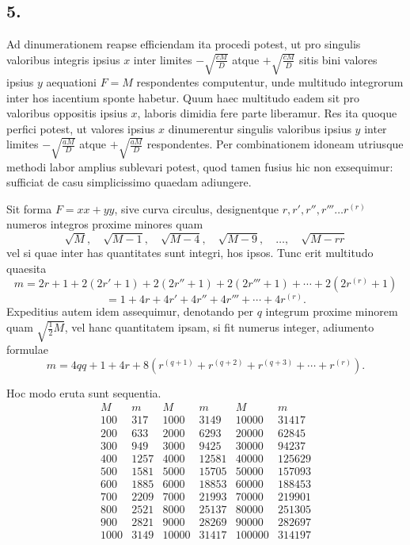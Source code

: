 \documentclass[12pt]{article}
\begin{document}
\subsection*{5.}

Ad dinumerationem reapse efficiendam ita procedi potest, ut pro singulis valoribus integris ipsius $x$ inter limites $-\sqrt{\frac{cM}{D}}$ atque $+\sqrt{\frac{cM}{D}}$ sitis bini valores ipsius $y$ aequationi $F=M$ respondentes computentur, unde multitudo integrorum inter hos iacentium sponte habetur. Quum haec multitudo eadem sit pro valoribus oppositis ipsius $x$, laboris dimidia fere parte liberamur. Res ita quoque perfici potest, ut valores ipsius $x$ dinumerentur singulis valoribus ipsius $y$ inter limites $-\sqrt{\frac{aM}{D}}$ atque $+\sqrt{\frac{aM}{D}}$ respondentes. Per combinationem idoneam utriusque methodi labor amplius sublevari potest, quod tamen fusius hic non exsequimur: sufficiat de casu simplicissimo quaedam adiungere.

Sit forma $F=xx+yy$, sive curva circulus, designentque $r,r',r'',r'''\ldots r^{(r)}$ numeros integros proxime minores quam
\[
\sqrt M,\quad \sqrt{M-1},\quad \sqrt{M-4},\quad \sqrt{M-9},\quad \ldots,\quad \sqrt{M-rr}
\]
vel si quae inter has quantitates sunt integri, hos ipsos. Tunc erit multitudo quaesita
\[
m=2r+1+2(2r'+1)+2(2r''+1)+2(2r'''+1)+\cdots+2(2r^{(r)}+1)
\]
\[
=1+4r+4r'+4r''+4r'''+\cdots+4r^{(r)}.
\]
Expeditius autem idem assequimur, denotando per $q$ integrum proxime minorem quam $\sqrt{\frac12 M}$, vel hanc quantitatem ipsam, si fit numerus integer, adiumento formulae
\[
m=4qq+1+4r+8\left(r^{(q+1)}+r^{(q+2)}+r^{(q+3)}+\cdots+r^{(r)}\right).
\]

Hoc modo eruta sunt sequentia.
\[
\begin{array}{rr|rr|rr}
M&m&M&m&M&m\\
100&317&1000&3149&10000&31417\\
200&633&2000&6293&20000&62845\\
300&949&3000&9425&30000&94237\\
400&1257&4000&12581&40000&125629\\
500&1581&5000&15705&50000&157093\\
600&1885&6000&18853&60000&188453\\
700&2209&7000&21993&70000&219901\\
800&2521&8000&25137&80000&251305\\
900&2821&9000&28269&90000&282697\\
1000&3149&10000&31417&100000&314197
\end{array}
\]
\end{document}
